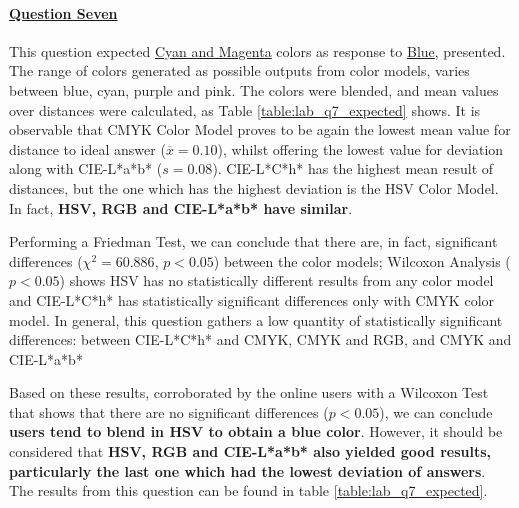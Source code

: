 \paragraph{\ul{Question Seven}}
%
This question expected \ul{Cyan and Magenta} colors as response to \ul{Blue}, presented. The range of colors generated as possible outputs from color models, varies between blue,
cyan, purple and pink.
The colors were blended, and mean values over distances were calculated, as Table \ref{table:lab_q7_expected} shows. It is observable that CMYK Color Model proves to be again the
lowest mean value for distance to ideal answer ($\overline{x} = 0.10$), whilst offering the lowest value for deviation along with CIE-L*a*b* ($s = 0.08$). CIE-L*C*h* has the
highest mean result of distances, but the one which has the highest deviation is the HSV Color Model. In fact, \textbf{HSV, RGB and CIE-L*a*b* have similar}. \par
%
Performing a Friedman Test, we can conclude that there are, in fact, significant differences ($\chi^2 = 60.886$, $p < 0.05$) between the color models; Wilcoxon Analysis ($p < 0.05$)
shows HSV has no statistically different results from any color model and CIE-L*C*h* has statistically significant differences only with CMYK color model. In general, this question
gathers a low quantity of statistically significant differences: between CIE-L*C*h* and CMYK, CMYK and RGB, and CMYK and CIE-L*a*b* \par
%
Based on these results, corroborated by the online users with a Wilcoxon Test that shows that there are no significant differences ($p < 0.05$), we can conclude \textbf{users tend
to blend in HSV to obtain a blue color}. However, it should be considered that \textbf{HSV, RGB and CIE-L*a*b* also yielded good results, particularly the last one which had the
lowest deviation of answers}. The results from this question can be found in table \ref{table:lab_q7_expected}.
%
